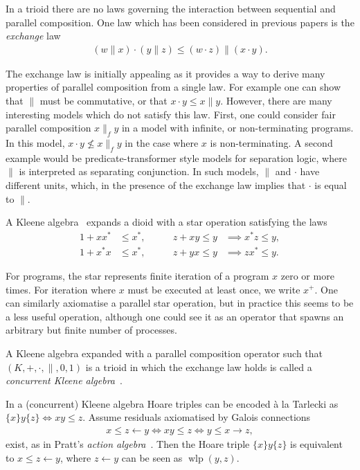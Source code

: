 \documentclass{llncs}
\DeclareMathOperator{\wlp}{wlp}
\begin{document}
In a trioid there are no laws governing the interaction between
sequential and parallel composition. One law which has been considered
in previous papers is the \emph{exchange} law~\cite{hoare_concurrent_2011,hoare_locality_2011}
\begin{align*}
  (w \| x) \cdot (y \| z) \le (w \cdot z) \| (x \cdot y).
\end{align*}

The exchange law is initially appealing as it provides a way to derive
many properties of parallel composition from a single law. For example
one can show that $\|$ must be commutative, or that $x\cdot y \le
x\|y$. However, there are many interesting models which do not satisfy
this law. First, one could consider fair parallel composition
$x\parallel_f y$ in a model with infinite, or non-terminating
programs. In this model, $x \cdot y \not\leq x \parallel_f y$ in the
case where $x$ is non-terminating. A second example would be
predicate-transformer style models for separation logic, where $\|$ is
interpreted as separating conjunction. In such models, $\|$ and
$\cdot$ have different units, which, in the presence of the exchange
law implies that $\cdot$ is equal to $\|$.

A Kleene algebra~\cite{kozen_completeness_1994} expands a dioid with a star operation satisfying the laws
\begin{align*}
  1 + xx^* &\le x^*, &\qquad z + xy \le y &\implies x^*z \le y,\\
  1 + x^*x &\le x^*, &\qquad z + yx \le y &\implies zx^* \le y.
\end{align*}

For programs, the star represents finite iteration of a program $x$
zero or more times. For iteration where $x$ must be executed at least
once, we write $x^+$. One can similarly axiomatise a parallel star
operation, but in practice this seems to be a less useful operation,
although one could see it as an operator that spawns an arbitrary but
finite number of processes.

A Kleene algebra expanded with a parallel composition operator such
that $(K,+,\cdot,\|,0,1)$ is a trioid in which the exchange law holds
is called a \emph{concurrent Kleene algebra}~\cite{hoare_concurrent_2011}.

In a (concurrent) Kleene algebra Hoare triples can be encoded \`a la
Tarlecki as $\{x\}y\{z\} \iff xy \le z$. Assume residuals axiomatised
by Galois connections
\begin{align*}
 x \le z \leftarrow y \iff xy \le z \iff y \le x \rightarrow z,
\end{align*}
exist, as in Pratt's \emph{action
  algebra}~\cite{pratt_action_1990}. Then the Hoare triple
$\{x\}y\{z\}$ is equivalent to $x \le z \leftarrow y$, where $z
\leftarrow y$ can be seen as $\wlp(y,z)$.
\end{document}
